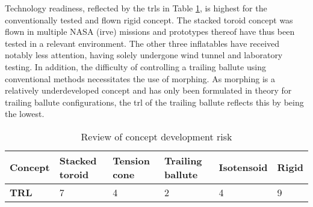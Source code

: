Technology readiness, reflected by the \glspl{trl} in Table \ref{tab:gls_rev}, is highest for the conventionally tested and flown rigid concept. The stacked toroid concept was flown in multiple NASA (\gls{irve}) missions and prototypes thereof have thus been tested in a relevant environment. The other three inflatables have received notably less attention, having solely undergone wind tunnel and laboratory testing. In addition, the difficulty of controlling a trailing ballute using conventional methods necessitates the use of morphing. As morphing is a relatively underdeveloped concept and has only been formulated in theory for trailing ballute configurations, the \gls{trl} of the trailing ballute reflects this by being the lowest.

\begin{table}[h]
\centering
\caption{Review of concept development risk}
\begin{tabular}{|p{}|p{}|p{}|p{}|p{}|p{}|}
\hline
\textbf{Concept} & \textbf{Stacked toroid} & \textbf{Tension cone} & \textbf{Trailing ballute} & \textbf{Isotensoid} & \textbf{Rigid} \\ \hline \hline
\textbf{TRL}     &\cellcolor{green!70} 7  &\cellcolor{yellow!75}  4   &\cellcolor{red!60} 2 & \cellcolor{yellow!75}      4          &\cellcolor{green!70} 9     \\ \hline
\end{tabular}
\label{tab:gls_rev}
\end{table}






